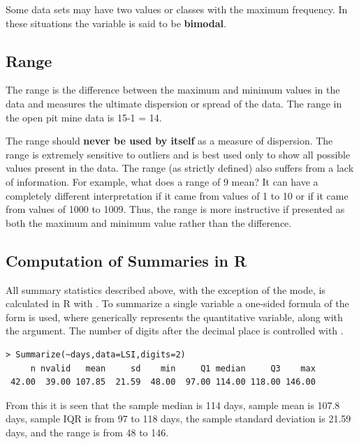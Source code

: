 \documentclass[10pt,openany]{book}\usepackage[]{graphicx}\usepackage[]{color}
\makeatletter
\newenvironment{kframe}{%
 \def\at@end@of@kframe{}%
 \ifinner\ifhmode%
  \def\at@end@of@kframe{\end{minipage}}%
  \begin{minipage}{\columnwidth}%
 \fi\fi%
 \def\FrameCommand##1{\hskip\@totalleftmargin \hskip-\fboxsep
 \colorbox{shadecolor}{##1}\hskip-\fboxsep
     \hskip-\linewidth \hskip-\@totalleftmargin \hskip\columnwidth}%
 \MakeFramed {\advance\hsize-\width
   \@totalleftmargin\z@ \linewidth\hsize
   \@setminipage}}%
 {\par\unskip\endMakeFramed%
 \at@end@of@kframe}
\newenvironment{knitrout}{}{} %
\makeatother
\begin{document}
Some data sets may have two values or classes with the maximum frequency. In these situations the variable is said to be \textbf{bimodal}.

\subsection{Range}
The range is the difference between the maximum and minimum values in the data and measures the ultimate dispersion or spread of the data. The range in the open pit mine data is 15-1 = 14.

The range should \textbf{never be used by itself} as a measure of dispersion. The range is extremely sensitive to outliers and is best used only to show all possible values present in the data. The range (as strictly defined) also suffers from a lack of information. For example, what does a range of 9 mean?  It can have a completely different interpretation if it came from values of 1 to 10 or if it came from values of 1000 to 1009. Thus, the range is more instructive if presented as both the maximum and minimum value rather than the difference.


\subsection{Computation of Summaries in R} \label{sect:DescStats}
All summary statistics described above, with the exception of the mode, is  calculated in R with . To summarize a single variable a one-sided formula of the form  is used, where  generically represents the quantitative variable, along with the  argument. The number of digits after the decimal place is controlled with .
\begin{knitrout}
\color{fgcolor}\begin{kframe}
\begin{verbatim}
> Summarize(~days,data=LSI,digits=2)
     n nvalid   mean     sd    min     Q1 median     Q3    max 
 42.00  39.00 107.85  21.59  48.00  97.00 114.00 118.00 146.00 
\end{verbatim}
\end{kframe}
\end{knitrout}

From this it is seen that the sample median is 114 days, sample mean is 107.8 days, sample IQR is from 97 to 118 days, the sample standard deviation is 21.59 days, and the range is from 48 to 146.
\end{document}
